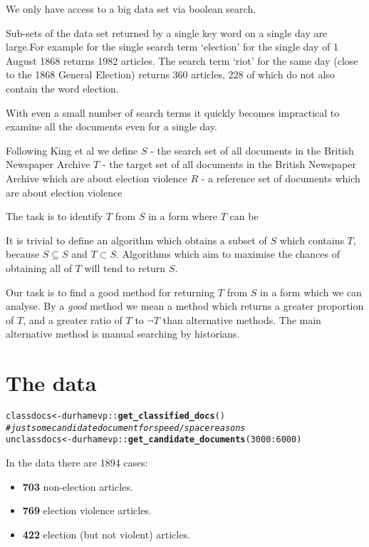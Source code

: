 \documentclass{article}\usepackage[]{graphicx}\usepackage[]{color}
\makeatletter
\newcommand{\hlnum}[1]{\textcolor[rgb]{0.686,0.059,0.569}{#1}}%
\newcommand{\hlcom}[1]{\textcolor[rgb]{0.678,0.584,0.686}{\textit{#1}}}%
\newcommand{\hlopt}[1]{\textcolor[rgb]{0,0,0}{#1}}%
\newcommand{\hlstd}[1]{\textcolor[rgb]{0.345,0.345,0.345}{#1}}%
\newcommand{\hlkwb}[1]{\textcolor[rgb]{0.69,0.353,0.396}{#1}}%
\newcommand{\hlkwd}[1]{\textcolor[rgb]{0.737,0.353,0.396}{\textbf{#1}}}%
\newenvironment{kframe}{%
 \def\at@end@of@kframe{}%
 \ifinner\ifhmode%
  \def\at@end@of@kframe{\end{minipage}}%
  \begin{minipage}{\columnwidth}%
 \fi\fi%
 \def\FrameCommand##1{\hskip\@totalleftmargin \hskip-\fboxsep
 \colorbox{shadecolor}{##1}\hskip-\fboxsep
     \hskip-\linewidth \hskip-\@totalleftmargin \hskip\columnwidth}%
 \MakeFramed {\advance\hsize-\width
   \@totalleftmargin\z@ \linewidth\hsize
   \@setminipage}}%
 {\par\unskip\endMakeFramed%
 \at@end@of@kframe}
\newenvironment{knitrout}{}{} %
\makeatother
\begin{document}
We only have access to a big data set via boolean search.

Sub-sets of the data set returned by a single key word on a single day are large.For example for the single search term `election' for the single day of 1 August 1868 returns 1982 articles. The search term `riot' for the same day (close to the 1868 General Election) returns 360 articles, 228 of which do not also contain the word election.

With even a small number of search terms it quickly becomes impractical to examine all the documents even for a single day.

Following King et al we define
$S$ - the search set of all documents in the British Newspaper Archive
$T$ - the target set of all documents in the British Newspaper Archive which are about election violence
$R$ - a reference set of documents which are about election violence

The task is to identify $T$ from $S$ in a form where $T$ can be

It is trivial to define an algorithm which obtains a subset of $S$ which contains $T$, because $S \subseteq S$ and $T \subset S$. Algorithms which aim to maximise the chances of obtaining all of $T$ will tend to return $S$.

Our task is to find a good method for returning $T$ from $S$ in a form which we can analyse. By a \textit{good} method we mean a method which returns a greater proportion of $T$, and a greater ratio of $T$ to $\neg T$ than alternative methods. The main alternative method is manual searching by historians.

\section{The data}
\begin{knitrout}
\color{fgcolor}\begin{kframe}
\begin{alltt}
\hlstd{classdocs} \hlkwb{<-} \hlstd{durhamevp}\hlopt{::}\hlkwd{get_classified_docs}\hlstd{()}
\hlcom{# just some candidate document for speed/space reasons}
\hlstd{unclassdocs} \hlkwb{<-} \hlstd{durhamevp}\hlopt{::}\hlkwd{get_candidate_documents}\hlstd{(}\hlnum{3000}\hlopt{:}\hlnum{6000}\hlstd{)}
\end{alltt}
\end{kframe}
\end{knitrout}

In the data there are 1894 cases:
\begin{itemize}
  \item \textbf{703} non-election articles.
  \item \textbf{769} election violence articles.
  \item \textbf{422} election (but not violent) articles.
\end{itemize}
\end{document}
